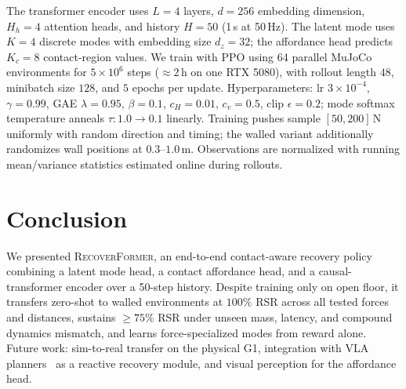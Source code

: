 \documentclass[conference,letterpaper]{IEEEtran}
\newcommand{\methodname}{\textsc{RecoverFormer}}
\begin{document}
The transformer encoder uses $L=4$ layers, $d=256$ embedding dimension, $H_h=4$ attention heads, and history $H=50$ (1\,s at 50\,Hz).
The latent mode uses $K=4$ discrete modes with embedding size $d_z{=}32$; the affordance head predicts $K_c=8$ contact-region values.
We train with PPO using 64 parallel MuJoCo~\cite{todorov2012mujoco} environments for $5{\times}10^6$ steps ($\approx 2$\,h on one RTX 5080), with rollout length $48$, minibatch size $128$, and $5$ epochs per update.
Hyperparameters: lr $3{\times}10^{-4}$, $\gamma{=}0.99$, GAE $\lambda{=}0.95$, $\beta{=}0.1$, $c_H{=}0.01$, $c_v{=}0.5$, clip $\epsilon{=}0.2$; mode softmax temperature anneals $\tau:1.0\to 0.1$ linearly.
Training pushes sample $[50,200]$\,N uniformly with random direction and timing; the walled variant additionally randomizes wall positions at $0.3$--$1.0$\,m.
Observations are normalized with running mean/variance statistics estimated online during rollouts.

\section{Conclusion}
\label{sec:conclusion}

We presented \methodname{}, an end-to-end contact-aware recovery policy combining a latent mode head, a contact affordance head, and a causal-transformer encoder over a 50-step history.
Despite training only on open floor, it transfers zero-shot to walled environments at $100\%$ RSR across all tested forces and distances, sustains $\ge 75\%$ RSR under unseen mass, latency, and compound dynamics mismatch, and learns force-specialized modes from reward alone.
Future work: sim-to-real transfer on the physical G1, integration with VLA planners~\cite{pi0_2024,helix2025,wholebodyvla2026} as a reactive recovery module, and visual perception for the affordance head.



\end{document}
